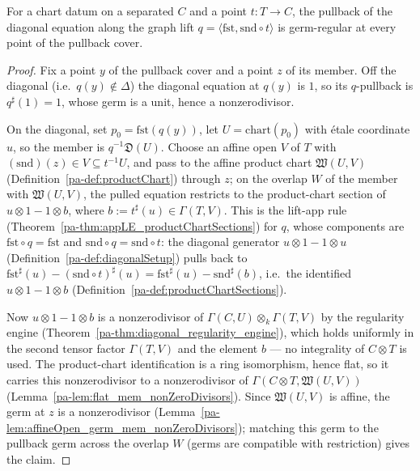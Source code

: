\begin{theorem}
  \label{pa-thm:graph_pullback_regular}
  \leanok

  For a chart datum on a separated \(C\) and a point \(t \colon T \to C\), the pullback of the
  diagonal equation along the graph lift \(q = \langle \mathrm{fst}, \mathrm{snd} \circ t\rangle\)
  is germ-regular at every point of the pullback cover.
\end{theorem}
\begin{proof}
  \leanok
  Fix a point \(y\) of the pullback cover and a point \(z\) of its member. Off the diagonal (i.e.\
  \(q(y) \notin \Delta\)) the diagonal equation at \(q(y)\) is \(1\), so its \(q\)-pullback is
  \(q^{\sharp}(1) = 1\), whose germ is a unit, hence a nonzerodivisor.

  On the diagonal, set \(p_0 = \mathrm{fst}(q(y))\), let \(U = \mathrm{chart}(p_0)\) with étale
  coordinate \(u\), so the member is \(q^{-1}\mathfrak D(U)\). Choose an affine open \(V\) of \(T\)
  with \((\mathrm{snd})(z) \in V \subseteq t^{-1}U\), and pass to the affine product chart
  \(\mathfrak W(U, V)\) (Definition~\ref{pa-def:productChart}) through \(z\); on the overlap \(W\) of
  the member with \(\mathfrak W(U, V)\), the pulled equation restricts to the product-chart section
  of \(u \otimes 1 - 1 \otimes b\), where \(b := t^{\sharp}(u) \in \Gamma(T, V)\). This is the
  lift-app rule (Theorem~\ref{pa-thm:appLE_productChartSections}) for \(q\), whose components are
  \(\mathrm{fst} \circ q = \mathrm{fst}\) and \(\mathrm{snd} \circ q = \mathrm{snd} \circ t\): the
  diagonal generator \(u \otimes 1 - 1 \otimes u\) (Definition~\ref{pa-def:diagonalSetup}) pulls back
  to \(\mathrm{fst}^{\sharp}(u) - (\mathrm{snd} \circ t)^{\sharp}(u) = \mathrm{fst}^{\sharp}(u) -
  \mathrm{snd}^{\sharp}(b)\), i.e.\ the identified \(u \otimes 1 - 1 \otimes b\)
  (Definition~\ref{pa-def:productChartSections}).

  Now \(u \otimes 1 - 1 \otimes b\) is a nonzerodivisor of \(\Gamma(C, U) \otimes_k \Gamma(T, V)\)
  by the regularity engine (Theorem~\ref{pa-thm:diagonal_regularity_engine}), which holds uniformly in
  the second tensor factor \(\Gamma(T, V)\) and the element \(b\) --- no integrality of \(C \otimes
  T\) is used. The product-chart identification is a ring isomorphism, hence flat, so it carries
  this nonzerodivisor to a nonzerodivisor of \(\Gamma(C \otimes T, \mathfrak W(U, V))\)
  (Lemma~\ref{pa-lem:flat_mem_nonZeroDivisors}). Since \(\mathfrak W(U, V)\) is affine, the germ at
  \(z\) is a nonzerodivisor (Lemma~\ref{pa-lem:affineOpen_germ_mem_nonZeroDivisors}); matching this
  germ to the pullback germ across the overlap \(W\) (germs are compatible with restriction) gives
  the claim.
\end{proof}

